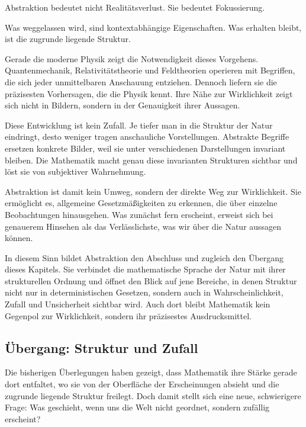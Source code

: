 \begin{DidacticBox}
	\label{box:abstraktion}
	Abstraktion bedeutet nicht Realitätsverlust.
	Sie bedeutet Fokussierung.
	
	Was weggelassen wird,
	sind kontextabhängige Eigenschaften.
	Was erhalten bleibt,
	ist die zugrunde liegende Struktur.
\end{DidacticBox}

Gerade die moderne Physik
zeigt die Notwendigkeit dieses Vorgehens.
Quantenmechanik,
Relativitätstheorie
und Feldtheorien
operieren mit Begriffen,
die sich jeder unmittelbaren Anschauung entziehen.
Dennoch liefern sie die präzisesten Vorhersagen,
die die Physik kennt.
Ihre Nähe zur Wirklichkeit
zeigt sich nicht in Bildern,
sondern in der Genauigkeit ihrer Aussagen.

Diese Entwicklung ist kein Zufall.
Je tiefer man in die Struktur der Natur eindringt,
desto weniger tragen anschauliche Vorstellungen.
Abstrakte Begriffe ersetzen konkrete Bilder,
weil sie unter verschiedenen Darstellungen invariant bleiben.
Die Mathematik macht genau diese invarianten Strukturen sichtbar
und löst sie von subjektiver Wahrnehmung.

Abstraktion ist damit kein Umweg,
sondern der direkte Weg zur Wirklichkeit.
Sie ermöglicht es,
allgemeine Gesetzmäßigkeiten zu erkennen,
die über einzelne Beobachtungen hinausgehen.
Was zunächst fern erscheint,
erweist sich bei genauerem Hinsehen
als das Verlässlichste,
was wir über die Natur aussagen können.

In diesem Sinn bildet Abstraktion
den Abschluss und zugleich den Übergang dieses Kapitels.
Sie verbindet die mathematische Sprache der Natur
mit ihrer strukturellen Ordnung
und öffnet den Blick auf jene Bereiche,
in denen Struktur nicht nur in deterministischen Gesetzen,
sondern auch in Wahrscheinlichkeit,
Zufall
und Unsicherheit sichtbar wird.
Auch dort bleibt Mathematik
kein Gegenpol zur Wirklichkeit,
sondern ihr präzisestes Ausdrucksmittel.

\subsection*{Übergang: Struktur und Zufall}

Die bisherigen Überlegungen haben gezeigt,
dass Mathematik ihre Stärke gerade dort entfaltet,
wo sie von der Oberfläche der Erscheinungen absieht
und die zugrunde liegende Struktur freilegt.
Doch damit stellt sich eine neue, schwierigere Frage:
Was geschieht,
wenn uns die Welt nicht geordnet,
sondern zufällig erscheint?


